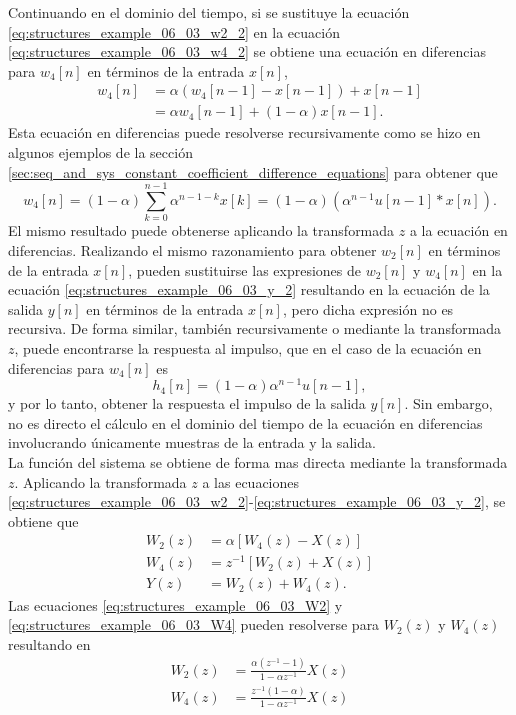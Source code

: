 \documentclass[a4paper]{report}
\begin{document}
Continuando en el dominio del tiempo, si se sustituye la ecuación \ref{eq:structures_example_06_03_w2_2} en la ecuación \ref{eq:structures_example_06_03_w4_2} se obtiene una ecuación en diferencias para \(w_4[n]\) en términos de la entrada \(x[n]\),
\begin{align*}
 w_4[n]&=\alpha(w_4[n-1]-x[n-1])+x[n-1]\\
  &=\alpha w_4[n-1]+(1-\alpha)x[n-1].
\end{align*}
Esta ecuación en diferencias puede resolverse recursivamente como se hizo en algunos ejemplos de la sección \ref{sec:seq_and_sys_constant_coefficient_difference_equations} para obtener que 
\[
 w_4[n]=(1-\alpha)\sum_{k=0}^{n-1}\alpha^{n-1-k}x[k]=(1-\alpha)(\alpha^{n-1}u[n-1]*x[n]).
\]
El mismo resultado puede obtenerse aplicando la transformada \(z\) a la ecuación en diferencias. Realizando el mismo razonamiento para obtener \(w_2[n]\) en términos de la entrada \(x[n]\), pueden sustituirse las expresiones de \(w_2[n]\) y \(w_4[n]\) en la ecuación \ref{eq:structures_example_06_03_y_2} resultando en la ecuación de la salida \(y[n]\) en términos de la entrada \(x[n]\), pero dicha expresión no es recursiva. De forma similar, también recursivamente o mediante la transformada \(z\), puede encontrarse la respuesta al impulso, que en el caso de la ecuación en diferencias para \(w_4[n]\) es
\[
 h_4[n]=(1-\alpha)\alpha^{n-1}u[n-1],
\]
y por lo tanto, obtener la respuesta el impulso de la salida \(y[n]\). Sin embargo, no es directo el cálculo en el dominio del tiempo de la ecuación en diferencias involucrando únicamente muestras de la entrada y la salida.
\\
La función del sistema se obtiene de forma mas directa mediante la transformada \(z\). Aplicando la transformada \(z\) a las ecuaciones \ref{eq:structures_example_06_03_w2_2}-\ref{eq:structures_example_06_03_y_2}, se obtiene que 
\begin{align}
 W_2(z)&=\alpha[W_4(z)-X(z)]\label{eq:structures_example_06_03_W2}\\
 W_4(z)&=z^{-1}[W_2(z)+X(z)]\label{eq:structures_example_06_03_W4}\\
 Y(z)&=W_2(z)+W_4(z)\label{eq:structures_example_06_03_Y}.
\end{align}
Las ecuaciones \ref{eq:structures_example_06_03_W2} y \ref{eq:structures_example_06_03_W4} pueden resolverse para \(W_2(z)\) y \(W_4(z)\) resultando en
\begin{align*}
 W_2(z)&=\frac{\alpha(z^{-1}-1)}{1-\alpha z^{-1}}X(z)\\
 W_4(z)&=\frac{z^{-1}(1-\alpha)}{1-\alpha z^{-1}}X(z)
\end{align*}
\end{document}
